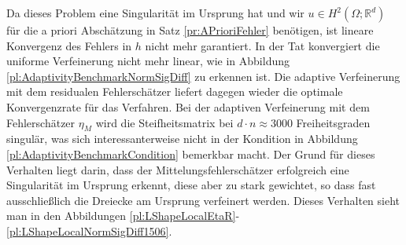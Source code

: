\documentclass{scrartcl}
\def\R{\mathbb{R}}
\begin{document}
Da dieses Problem eine Singularität im Ursprung hat und wir $u\in H^2(\Omega;\R^d)$ für die a priori Abschätzung in Satz \ref{pr:APrioriFehler} benötigen, ist lineare Konvergenz des Fehlers in $h$ nicht mehr garantiert. In der Tat konvergiert die uniforme Verfeinerung nicht mehr linear, wie in Abbildung \ref{pl:AdaptivityBenchmarkNormSigDiff} zu erkennen ist. Die adaptive Verfeinerung mit dem residualen Fehlerschätzer liefert dagegen wieder die optimale Konvergenzrate für das Verfahren. Bei der adaptiven Verfeinerung mit dem Fehlerschätzer $\eta_M$ wird die Steifheitsmatrix bei $d\cdot n\approx3000$ Freiheitsgraden singulär, was sich interessanterweise nicht in der Kondition in Abbildung \ref{pl:AdaptivityBenchmarkCondition} bemerkbar macht.
Der Grund für dieses Verhalten liegt darin, dass der Mittelungsfehlerschätzer erfolgreich eine Singularität im Ursprung erkennt, diese aber zu stark gewichtet, so dass fast ausschließlich die Dreiecke am Ursprung verfeinert werden. Dieses Verhalten sieht man in den Abbildungen \ref{pl:LShapeLocalEtaR}-\ref{pl:LShapeLocalNormSigDiff1506}. 
\end{document}
